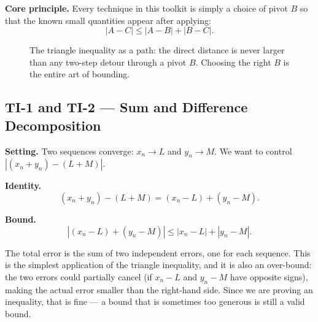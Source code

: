 \medskip

\noindent\textbf{Core principle.}
Every technique in this toolkit is simply a choice of pivot $B$ so that
the known small quantities appear after applying:
\[
  |A - C| \le |A - B| + |B - C|.
\]

\begin{figure}[h]
\centering
{}
\caption{The triangle inequality as a path: the direct distance is
never larger than any two-step detour through a pivot $B$.
Choosing the right $B$ is the entire art of bounding.}
\end{figure}

\subsection{TI-1 and TI-2 — Sum and Difference Decomposition}

\textbf{Setting.} Two sequences converge: $x_n \to L$ and $y_n \to M$.
We want to control $|(x_n + y_n) - (L+M)|$.

\textbf{Identity.}
\[
  (x_n + y_n) - (L+M) = (x_n - L) + (y_n - M).
\]

\textbf{Bound.}
\[
  |(x_n - L) + (y_n - M)| \le |x_n - L| + |y_n - M|.
\]

The total error is the sum of two independent errors, one for each
sequence. This is the simplest application of the triangle inequality,
and it is also an over-bound: the two errors could partially cancel
(if $x_n - L$ and $y_n - M$ have opposite signs), making the actual
error smaller than the right-hand side. Since we are proving an
inequality, that is fine — a bound that is sometimes too generous
is still a valid bound.

